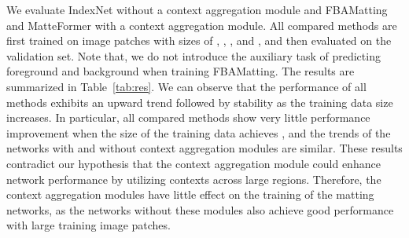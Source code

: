 \documentclass[10pt,twocolumn,letterpaper]{article}
\begin{document}
\begin{table}[!t]
  \centering
  \caption{Comparison of state-of-the-art matting methods~\cite{lu2019indices,forte2020fbamatting,park2022matteformer} trained on Adobe Composition-1K dataset using image patches of different sizes. }
  \label{tab:res}\end{table}


We evaluate IndexNet without a context aggregation module and FBAMatting and MatteFormer with a context aggregation module. 
All compared methods are first trained on image patches with sizes of , , , and , and then evaluated on the validation set. 
Note that, we do not introduce the auxiliary task of predicting foreground and background when training FBAMatting.
The results are summarized in Table~\ref{tab:res}. 
We can observe that the performance of all methods exhibits an upward trend followed by stability as the training data size increases. 
In particular, all compared methods show very little performance improvement when the size of the training data achieves , and the trends of the networks with and without context aggregation modules are similar. 
These results contradict our hypothesis that the context aggregation module could enhance network performance by utilizing contexts across large regions.
Therefore, the context aggregation modules have little effect on the training of the matting networks, as the networks without these modules also achieve good performance with large training image patches.
\end{document}
